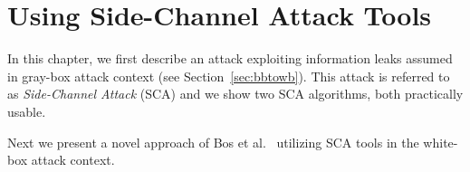 \chapter{Using Side-Channel Attack Tools}
\label{chap:attack}

In this chapter, we first describe an attack exploiting information leaks assumed in gray-box attack context (see Section~\ref{sec:bbtowb}). This attack is referred to as {\em Side-Channel Attack} (SCA) and we show two SCA algorithms, both practically usable.

Next we present a novel approach of Bos et al.\ \cite{bos2015differential} utilizing SCA tools in the white-box attack context.




